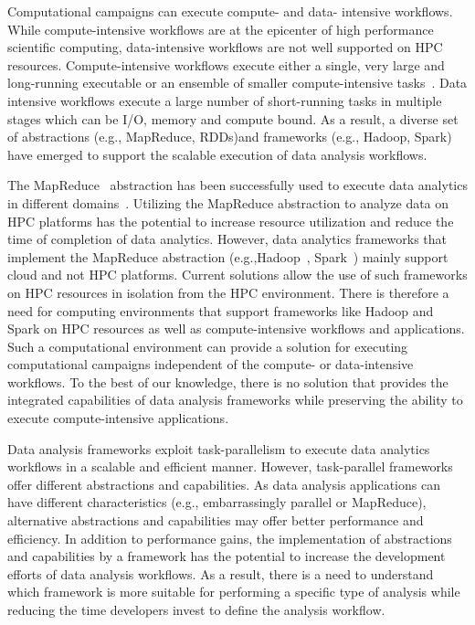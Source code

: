 Computational campaigns can execute compute- and data- intensive workflows. 
While compute-intensive workflows are at the epicenter of high performance 
scientific computing, data-intensive workflows are not well supported on HPC 
resources. Compute-intensive workflows execute either a single, very large and 
long-running executable or an ensemble of smaller compute-intensive 
tasks~\cite{balasubramanian2018harnessing}. Data intensive workflows execute a 
large number of short-running tasks in multiple stages which can be I/O, memory 
and compute bound. As a result, a diverse set of abstractions (e.g., MapReduce, 
RDDs)and frameworks (e.g., Hadoop, Spark) have emerged to support the scalable 
execution of data analysis workflows.


The MapReduce~\cite{dean2004mapreduce} abstraction has been successfully used to
execute data analytics in different domains~\cite{hellerstein2012science}.
Utilizing the MapReduce abstraction to analyze data on HPC platforms has the 
potential to increase resource utilization and reduce the time of completion of 
data analytics. However, data analytics frameworks that implement the MapReduce 
abstraction (e.g.,Hadoop~\cite{hadoop}, Spark~\cite{zaharia2010spark}) mainly 
support cloud and not HPC platforms. Current solutions allow the use of such 
frameworks on HPC resources in isolation from the HPC environment. There is 
therefore a need for computing environments that support frameworks like Hadoop 
and Spark on HPC resources as well as compute-intensive workflows and 
applications. Such a computational environment can provide a solution for 
executing computational campaigns independent of the compute- or data-intensive 
workflows. To the best of our knowledge, there is no solution that provides the 
integrated capabilities of data analysis frameworks while preserving the 
ability to execute compute-intensive applications.

Data analysis frameworks exploit task-parallelism to execute data analytics
workflows in a scalable and efficient manner. However, task-parallel frameworks
offer different abstractions and capabilities. As data analysis applications
can have different characteristics (e.g., embarrassingly parallel or
MapReduce), alternative abstractions and capabilities may offer better
performance and efficiency. In addition to performance gains, the 
implementation of abstractions and capabilities by a framework has the 
potential to increase the development efforts of data analysis 
workflows. As a result, there is a need to understand which framework is more 
suitable for performing a specific type of analysis while reducing the time 
developers invest to define the analysis workflow.

